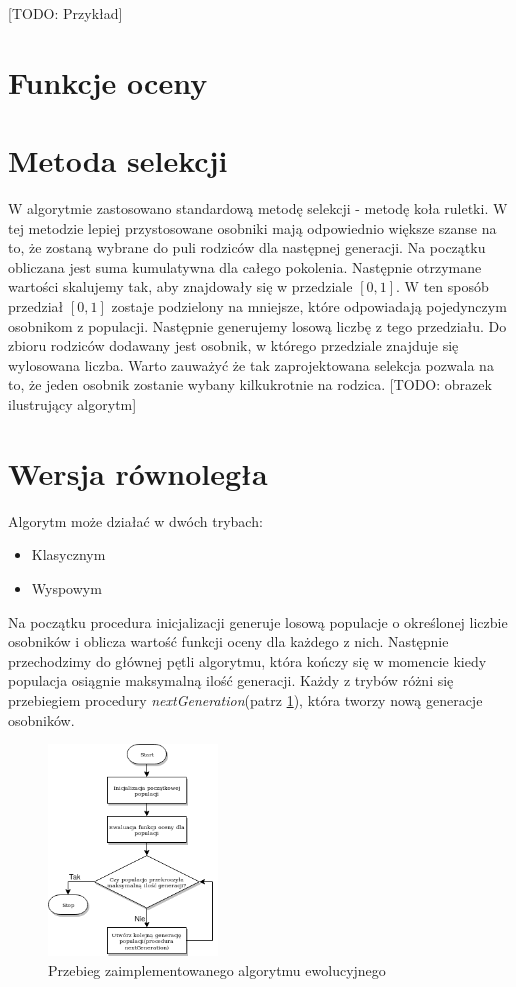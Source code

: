 [TODO: Przykład]

\section{Funkcje oceny}


\section{Metoda selekcji}
W algorytmie zastosowano standardową metodę selekcji - metodę koła ruletki. W tej metodzie lepiej przystosowane osobniki mają odpowiednio większe 
szanse na to, że zostaną wybrane do puli rodziców dla następnej generacji. Na początku obliczana jest suma kumulatywna dla całego pokolenia. Następnie 
otrzymane wartości skalujemy tak, aby znajdowały się w przedziale $[0, 1]$. W ten sposób przedział $[0, 1]$ zostaje podzielony na mniejsze, które 
odpowiadają pojedynczym osobnikom z populacji. Następnie generujemy losową liczbę z tego przedziału. Do zbioru rodziców dodawany jest osobnik, 
w którego przedziale znajduje się wylosowana liczba. Warto zauważyć że tak zaprojektowana selekcja pozwala na to, że jeden osobnik zostanie wybany 
kilkukrotnie na rodzica.
[TODO: obrazek ilustrujący algorytm]

\section{Wersja równoległa}
Algorytm może działać w dwóch trybach:
\begin{itemize}
    \item Klasycznym
    \item Wyspowym
\end{itemize}

Na początku procedura inicjalizacji generuje losową populacje o określonej liczbie osobników i oblicza wartość funkcji oceny dla każdego z nich. 
Następnie przechodzimy do głównej pętli algorytmu, która kończy się w momencie kiedy populacja osiągnie maksymalną ilość generacji. 
Każdy z trybów różni się przebiegiem procedury \textit{nextGeneration}(patrz \ref{alg_main_img}), która tworzy nową generacje osobników.

\begin{figure}[H]
    \centering        
    \includegraphics[width=0.4\textwidth]{img/alg_main.png}
    \caption{Przebieg zaimplementowanego algorytmu ewolucyjnego}
    \label{alg_main_img}
\end{figure}

